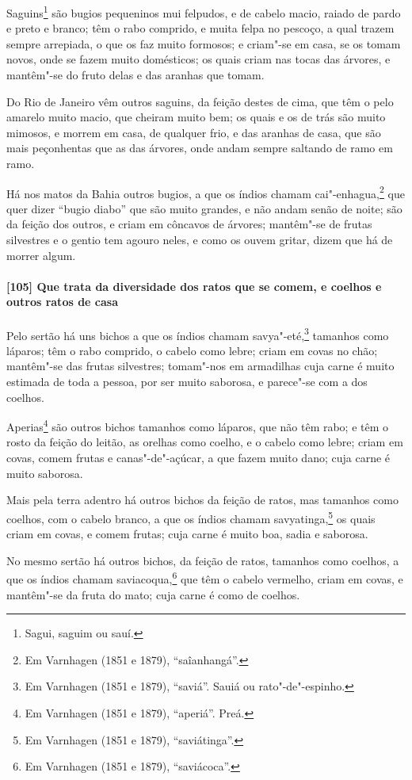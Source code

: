 \begin{linenumbers}
Saguins\footnote{ Sagui, saguim ou sauí.} são bugios pequeninos mui felpudos, e de cabelo
macio, raiado de pardo e preto e branco; têm o rabo comprido, e muita felpa no pescoço, a
qual trazem sempre arrepiada, o que os faz muito formosos; e criam"-se em casa, se os tomam
novos, onde se fazem muito domésticos; os quais criam nas tocas das árvores, e mantêm"-se
do fruto delas e das aranhas que tomam.

Do Rio de Janeiro vêm outros saguins, da feição destes de cima, que têm o pelo amarelo
muito macio, que cheiram muito bem; os quais e os de trás são muito mimosos, e morrem em
casa, de qualquer frio, e das aranhas de casa, que são mais peçonhentas que as das
árvores, onde andam sempre saltando de ramo em ramo.

Há nos matos da Bahia outros bugios, a que os índios chamam cai"-enhagua,\footnote{ Em
Varnhagen (1851 e 1879), ``saîanhangá''.} que quer dizer ``bugio diabo'' que são muito
grandes, e não andam senão de noite; são da feição dos outros, e criam em côncavos de
árvores; mantêm"-se de frutas silvestres e o gentio tem agouro neles, e como os ouvem
gritar, dizem que há de morrer algum.

\paragraph{[105] Que trata da diversidade dos ratos que se comem, e coelhos e outros ratos
de casa}\quad
Pelo sertão há uns bichos a que os índios chamam savya"-eté,\footnote{ Em Varnhagen (1851 e
1879), ``saviá''. Sauiá ou rato"-de"-espinho.} tamanhos como láparos; têm o rabo comprido,
o cabelo como lebre; criam em covas no chão; mantêm"-se das frutas silvestres; tomam"-nos em
armadilhas cuja carne é muito estimada de toda a pessoa, por ser muito saborosa, e
parece"-se com a dos coelhos.

Aperias\footnote{ Em Varnhagen (1851 e 1879), ``aperiá''. Preá.} são outros bichos
tamanhos como láparos, que não têm rabo; e têm o rosto da feição do leitão, as orelhas
como coelho, e o cabelo como lebre; criam em covas, comem frutas e canas"-de"-açúcar, a que
fazem muito dano; cuja carne é muito saborosa.

Mais pela terra adentro há outros bichos da feição de ratos, mas tamanhos como coelhos,
com o cabelo branco, a que os índios chamam savyatinga,\footnote{ Em Varnhagen (1851 e
1879), ``saviátinga''.} os quais criam em covas, e comem frutas; cuja carne é muito boa,
sadia e saborosa.

No mesmo sertão há outros bichos, da feição de ratos, tamanhos como coelhos, a que os
índios chamam saviacoqua,\footnote{ Em Varnhagen (1851 e 1879), ``saviácoca''.} que têm o
cabelo vermelho, criam em covas, e mantêm"-se da fruta do mato; cuja carne é como de
coelhos.


\end{linenumbers}
